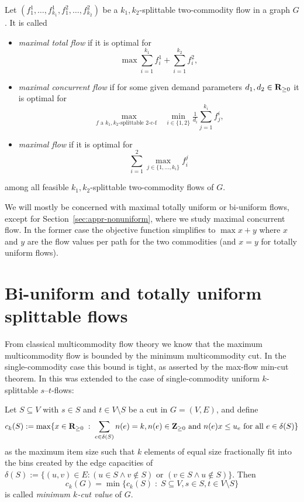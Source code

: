 \begin{definition}
  Let $(f^1_1,\dots,f^1_{k_1},f^2_{1},\dots,f^2_{k_2})$ be a
  $k_1,k_2$-splittable two-commodity flow in a graph $G$. It is called 
  \begin{itemize}
  \item \emph{maximal total flow} if it is optimal for 
    $$\max
    \sum_{i=1}^{k_1} f^1_i+\sum_{i=1}^{k_2}f^2_i,$$

  \item \emph{maximal concurrent flow} if for some given demand 
    parameters $d_1,d_2\in\mathbf{R}_{\geq 0}$ it is optimal for
    $$\max_{\text{$f$ a $k_1,k_2$-splittable 2-c-f}\quad}
    \min_{i\in\{1,2\}}
    \tfrac{1}{d_i}\sum_{j=1}^{k_i}f_j^i,
    $$
  \item \emph{maximal flow} if it is 
    optimal for
    $$ \sum_{i=1}^2\max_{j\in\{1,\dots,k_i\}} f_i^j$$
  \end{itemize}
  among all feasible $k_1,k_2$-splittable two-commodity flows of $G$.
\end{definition}

We will mostly be concerned with maximal totally uniform or bi-uniform
flows, except for Section~\ref{sec:appr-nonuniform}, where we study
maximal concurrent flow. In the former case the objective function
simplifies to $\max x+y$ where $x$ and $y$ are the flow
values per path for the two commodities (and $x=y$ for totally uniform
flows).

\section{Bi-uniform and totally uniform splittable flows}
\label{sec:totally-uniform}

From classical multicommodity flow theory we know that the maximum
multicommodity flow is bounded by the minimum multicommodity cut. In
the single-commodity case this bound is tight, as asserted by the
max-flow min-cut theorem. In \cite{baier-koehler-skutella:05} this was
extended to the case of single-commodity uniform $k$-splittable
$s$--$t$-flows:
\begin{definition}
  Let $S\subseteq V$ with $s\in S$ and $t\in V\setminus S$ be a cut in
  $G=(V,E)$, and define 
  \begin{equation}
    \label{eq:ck}
    c_k(S):=\max\{x\in\mathbf{R}_{\geq 0}\;:\; 
    \sum_{e\in\delta(S)}n(e)=k, n(e)\in\mathbf{Z}_{\geq0}\text{ and }n(e)x\leq u_e \text{ for all }e\in\delta(S)\}
  \end{equation}
  as the maximum item size such that $k$ elements of equal size fractionally 
  fit into the bins created by the edge capacities of $\delta(S) := \{(u,v) \in E \colon (u \in S \land v \notin S) \text{ or } (v \in S \land u \notin S)\}$.
  Then
  \begin{equation}
    \label{eq:ckG}
    c_k(G)=\min\{c_k(S)\;:\; S\subseteq V, s\in S, t\in V\setminus S\}
  \end{equation}
  is called \emph{minimum $k$-cut value} of $G$.  
\end{definition}

